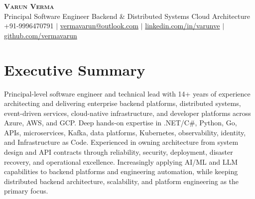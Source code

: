 \documentclass[letterpaper,10.5pt]{article}
\begin{document}
\begin{center}
    {\Huge \scshape \textbf{Varun Verma}} \\ \vspace{2pt}
    \small
    Principal Software Engineer \textbar{} Backend \& Distributed Systems \textbar{} Cloud Architecture
    \\ \vspace{2pt}
    \small +91-9996470791 $|$
    \href{mailto:vermavarun@outlook.com}{vermavarun@outlook.com} $|$
    \href{https://linkedin.com/in/varunve}{linkedin.com/in/varunve} $|$
    \href{https://github.com/vermavarun}{github.com/vermavarun}
\end{center}

\section{Executive Summary}
\small{
Principal-level software engineer and technical lead with 14+ years of experience architecting and delivering enterprise backend platforms, distributed systems, event-driven services, cloud-native infrastructure, and developer platforms across Azure, AWS, and GCP. Deep hands-on expertise in .NET/C\#, Python, Go, APIs, microservices, Kafka, data platforms, Kubernetes, observability, identity, and Infrastructure as Code. Experienced in owning architecture from system design and API contracts through reliability, security, deployment, disaster recovery, and operational excellence. Increasingly applying AI/ML and LLM capabilities to backend platforms and engineering automation, while keeping distributed backend architecture, scalability, and platform engineering as the primary focus.
}

\end{document}
